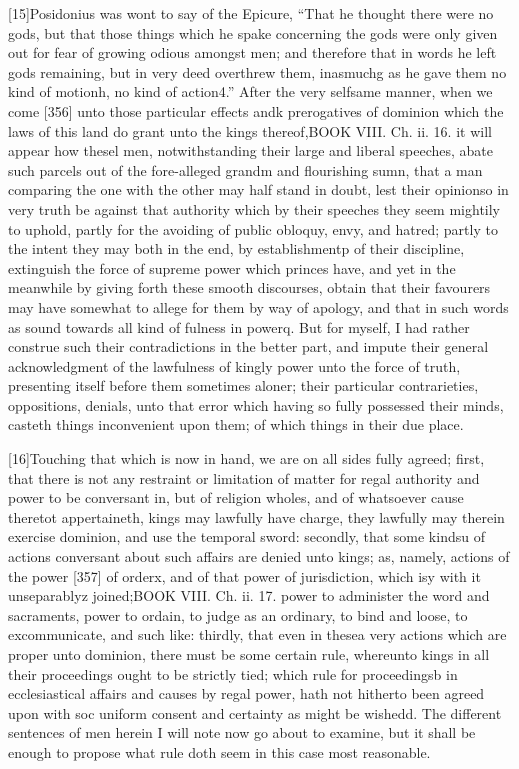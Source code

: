 [15]Posidonius was wont to say of the Epicure, “That he thought there were no gods, but that those things which he spake concerning the gods were only given out for fear of growing odious amongst men; and therefore that in words he left gods remaining, but in very deed overthrew them, inasmuchg as he gave them no kind of motionh, no kind of action4.” After the very selfsame manner, when we come [356] unto those particular effects andk prerogatives of dominion which the laws of this land do grant unto the kings thereof,BOOK VIII. Ch. ii. 16. it will appear how thesel men, notwithstanding their large and liberal speeches, abate such parcels out of the fore-alleged grandm and flourishing sumn, that a man comparing the one with the other may half stand in doubt, lest their opinionso in very truth be against that authority which by their speeches they seem mightily to uphold, partly for the avoiding of public obloquy, envy, and hatred; partly to the intent they may both in the end, by establishmentp of their discipline, extinguish the force of supreme power which princes have, and yet in the meanwhile by giving forth these smooth discourses, obtain that their favourers may have somewhat to allege for them by way of apology, and that in such words as sound towards all kind of fulness in powerq. But for myself, I had rather construe such their contradictions in the better part, and impute their general acknowledgment of the lawfulness of kingly power unto the force of truth, presenting itself before them sometimes aloner; their particular contrarieties, oppositions, denials, unto that error which having so fully possessed their minds, casteth things inconvenient upon them; of which things in their due place.

[16]Touching that which is now in hand, we are on all sides fully agreed; first, that there is not any restraint or limitation of matter for regal authority and power to be conversant in, but of religion wholes, and of whatsoever cause theretot appertaineth, kings may lawfully have charge, they lawfully may therein exercise dominion, and use the temporal sword: secondly, that some kindsu of actions conversant about such affairs are denied unto kings; as, namely, actions of the power [357] of orderx, and of that power of jurisdiction, which isy with it unseparablyz joined;BOOK VIII. Ch. ii. 17. power to administer the word and sacraments, power to ordain, to judge as an ordinary, to bind and loose, to excommunicate, and such like: thirdly, that even in thesea very actions which are proper unto dominion, there must be some certain rule, whereunto kings in all their proceedings ought to be strictly tied; which rule for proceedingsb in ecclesiastical affairs and causes by regal power, hath not hitherto been agreed upon with soc uniform consent and certainty as might be wishedd. The different sentences of men herein I will note now go about to examine, but it shall be enough to propose what rule doth seem in this case most reasonable.


